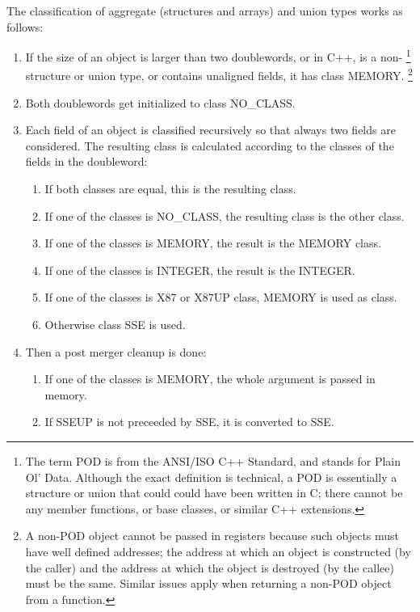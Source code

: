 The classification of aggregate (structures and arrays) and union
types works as follows:

\begin{enumerate}
\item If the size of an object is larger than two doublewords, or
    in C++, is a non-%
\footnote{The term POD is from the ANSI/ISO C++ Standard, and
    stands for Plain Ol' Data.  Although the exact definition is
    technical, a POD is essentially a structure or union that could
    could have been written in C; there cannot be any member
    functions, or base classes, or similar C++ extensions.} 
  structure or union type, or contains unaligned fields, it has class
  MEMORY.%
   \footnote{A non-POD object cannot be passed in registers
    because such objects must have well defined addresses; the address
    at which an object is constructed (by the caller) and the address
    at which the object is destroyed (by the callee) must be the same.
    Similar issues apply when returning a non-POD object from a
    function.}

\item Both doublewords get initialized to class NO_CLASS.

\item Each field of an object is classified recursively so that always
   two fields are considered.  The resulting class is calculated
   according to the classes of the fields in the doubleword:
   \begin{enumerate}
   \item
      If both classes are equal, this is the resulting class.
   \item If one of the classes is NO_CLASS, the resulting class is the other class.
   \item If one of the classes is MEMORY, the result is the MEMORY class.
   \item If one of the classes is INTEGER, the result is the INTEGER.
   \item If one of the classes is X87 or X87UP class, MEMORY is used as
      class.
   \item Otherwise class SSE is used.
   \end{enumerate}
\item Then a post merger cleanup is done:
  \begin{enumerate}
  \item If one of the classes is MEMORY, the whole argument is passed in memory.
  \item If SSEUP is not preceeded by SSE, it is converted to SSE.
  \end{enumerate}
\end{enumerate}

